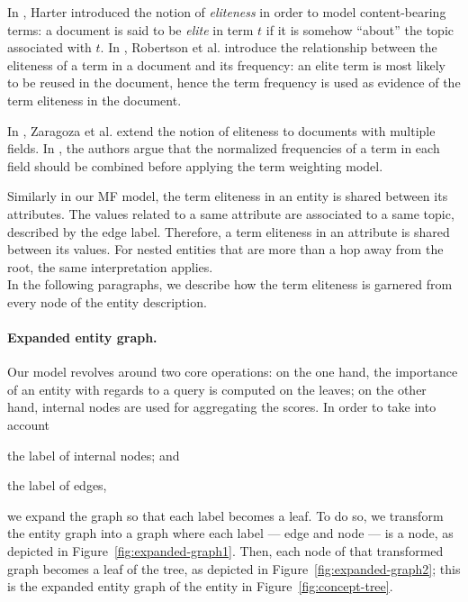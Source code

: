 In \cite{harter:1974:thesis}, Harter introduced the notion of \emph{eliteness} in order to model content-bearing terms: a document is said to be \emph{elite} in term $t$ if it is somehow ``about'' the topic associated with $t$. In \cite{robertson:1981:PMI}, Robertson et al. introduce the relationship between the eliteness of a term in a document and its frequency: an elite term is most likely to be reused in the document, hence the term frequency is used as evidence of the term eliteness in the document.

In \cite{zaragoza:2004:microsoft}, Zaragoza et al. extend the notion of eliteness to documents with multiple fields. In \cite{robertson:2004:cikm}, the authors argue that the normalized frequencies of a term in each field should be combined before applying the term weighting model.

Similarly in our MF model, the term eliteness in an entity is shared between its attributes. The values related to a same attribute are associated to a same topic, described by the edge label. Therefore, a term eliteness in an attribute is shared between its values. For nested entities that are more than a hop away from the root, the same interpretation applies.\\

In the following paragraphs, we describe how the term eliteness is garnered from every node of the entity description.

\paragraph{Expanded entity graph.}

Our model revolves around two core operations: on the one hand, the importance of an entity with regards to a query is computed on the leaves; on the other hand, internal nodes are used for aggregating the scores. In order to take into account
\begin{inparaenum}[(a)]
	\item the label of internal nodes; and
	\item the label of edges,
\end{inparaenum}
we expand the graph so that each label becomes a leaf. To do so, we transform the entity graph into a graph where each label --- edge and node --- is a node, as depicted in Figure~\ref{fig:expanded-graph1}. Then, each node of that transformed graph becomes a leaf of the tree, as depicted in Figure~\ref{fig:expanded-graph2}; this is the expanded entity graph of the entity in Figure~\ref{fig:concept-tree}.

